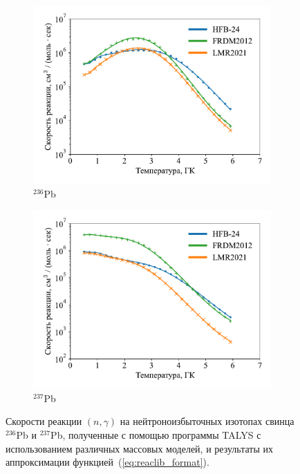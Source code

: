 \begin{figure}
  \centering
  \begin{subfigure}{0.48\textwidth}
    \centering
    \includegraphics[width=\textwidth]{pics/ng_fit_pb236.pdf}
    \caption{${}^{236}$Pb}
  \end{subfigure}
  \hfil
  \begin{subfigure}{0.48\textwidth}
    \centering
    \includegraphics[width=\textwidth]{pics/ng_fit_pb237.pdf}
    \caption{${}^{237}$Pb}
  \end{subfigure}
  \caption{Скорости реакции $(n,\gamma)$ на нейтроноизбыточных изотопах свинца ${}^{236}$Pb и ${}^{237}$Pb, полученные с помощью программы TALYS с использованием различных массовых моделей, и результаты их аппроксимации функцией~(\ref{eq:reaclib_format}).}
  \label{fig:ng_approx}
\end{figure}

